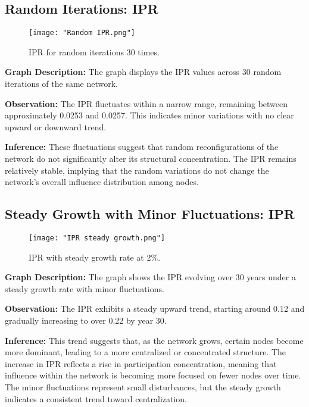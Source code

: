 \documentclass{article} %
\begin{document}
\subsection{Random Iterations: IPR}

\begin{figure}[h]
\begin{center}
    \texttt{[image: "Random IPR.png"]}
\end{center}
\caption{IPR for random iterations 30 times.}
\end{figure}
\textbf{Graph Description:} The graph displays the IPR values across 30 random iterations of the same network.

\textbf{Observation:} The IPR fluctuates within a narrow range, remaining between approximately 0.0253 and 0.0257. This indicates minor variations with no clear upward or downward trend.

\textbf{Inference:} These fluctuations suggest that random reconfigurations of the network do not significantly alter its structural concentration. The IPR remains relatively stable, implying that the random variations do not change the network’s overall influence distribution among nodes.


\subsection{Steady Growth with Minor Fluctuations: IPR}
\begin{figure}[h]
\begin{center}
    \texttt{[image: "IPR steady growth.png"]}
\end{center}
\caption{IPR with steady growth rate at 2\%.}
\end{figure}

\textbf{Graph Description:} The graph shows the IPR evolving over 30 years under a steady growth rate with minor fluctuations.

\textbf{Observation:} The IPR exhibits a steady upward trend, starting around 0.12 and gradually increasing to over 0.22 by year 30.

\textbf{Inference:} This trend suggests that, as the network grows, certain nodes become more dominant, leading to a more centralized or concentrated structure. The increase in IPR reflects a rise in participation concentration, meaning that influence within the network is becoming more focused on fewer nodes over time. The minor fluctuations represent small disturbances, but the steady growth indicates a consistent trend toward centralization.
\end{document}
